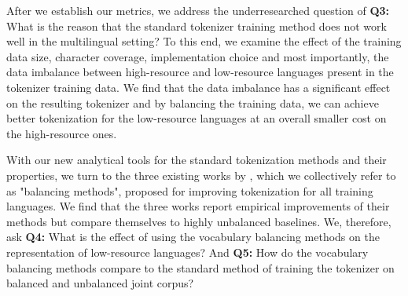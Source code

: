 After we establish our metrics, we address the underresearched question of \textbf{Q3:} What is the reason that the standard tokenizer training method does not work well in the multilingual setting? To this end, we examine the effect of the training data size, character coverage, implementation choice and most importantly, the data imbalance between high-resource and low-resource languages present in the tokenizer training data. We find that the data imbalance has a significant effect on the resulting tokenizer and by balancing the training data, we can achieve better tokenization for the low-resource languages at an overall smaller cost on the high-resource ones.


%  

With our new analytical tools for the standard tokenization methods and their properties, we turn to the three existing works by \citet{chung_improving_2020,zheng_allocating_2021,liang_xlm-v_2023}, which we collectively refer to as "balancing methods", proposed for improving tokenization for all training languages. We find that the three works report empirical improvements of their methods but compare themselves to highly unbalanced baselines. We, therefore, ask \textbf{Q4:} What is the effect of using the vocabulary balancing methods on the representation of low-resource languages? And
\textbf{Q5:} How do the vocabulary balancing methods compare to the standard method of training the tokenizer on balanced and unbalanced joint corpus?

